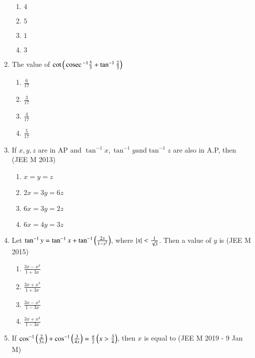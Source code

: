 \documentclass[journal,12pt,twocolumn]{IEEEtran}
\theoremstyle{remark}
\begin{document}
\begin{enumerate}
{\begin{multicols}{2}
		\begin{enumerate}
			\item{$4$}
			\item{$5$}
			\columnbreak
			\item{$1$}
			\item{$3$}
		\end{enumerate}
		\end{multicols}
	}
	\item{
			The value of $\cot\left(\,\text{cosec}\,^{-1}\frac{5}{3} + \tan^{-1}\frac{2}{3}\right)$
		\begin{multicols}{4}
		\begin{enumerate}
			\item{$\frac{6}{17}$}
			\columnbreak
			\item{$\frac{3}{17}$}
			\columnbreak
			\item{$ \frac{4}{17}$}
			\columnbreak
			\item{$ \frac{5}{17}$}
		\end{enumerate}
		\end{multicols}
	}
	\item{
			If $x,y,z$ are in AP and $\tan^{-1}x, \tan^{-1}y \text{and} \tan^{-1}z$ are also in A.P, then \hfill (JEE M 2013)
		\begin{multicols}{2}
		\begin{enumerate}
			\item{$x=y=z$}
			\item{$2x=3y=6z$}
			\columnbreak
			\item{$6x=3y=2z$}
			\item{$6x=4y=3z$}
		\end{enumerate}
		\end{multicols}
	}
	\item{
			Let $\tan^{-1}y = \tan^{-1}x + \tan^{-1}\left(\frac{2x}{1-x^2}\right)$, where $\left\vert x\right\vert < \frac{1}{\sqrt{3}}$. Then a value of $y$ is \hfill (JEE M 2015)
		\begin{multicols}{4}
		\begin{enumerate}
			\item{$\frac{3x - x^3}{1 + 3x}$}
			\columnbreak
			\item{$\frac{3x + x^3}{1 + 3x}$}
			\columnbreak
			\item{$\frac{3x - x^3}{1 - 3x}$}
			\columnbreak
			\item{$\frac{3x + x^3}{1 - 3x}$}
		\end{enumerate}
		\end{multicols}
	}
	\item{
			If $\cos^{-1}\left(\frac{2}{3x}\right) + \cos^{-1}\left(\frac{3}{4x}\right) = \frac{\pi}{2} \left(x > \frac{3}{4}\right)$, then $x$ is equal to \hfill (JEE M 2019 - 9 Jan M)
}
\end{enumerate}
\end{document}
